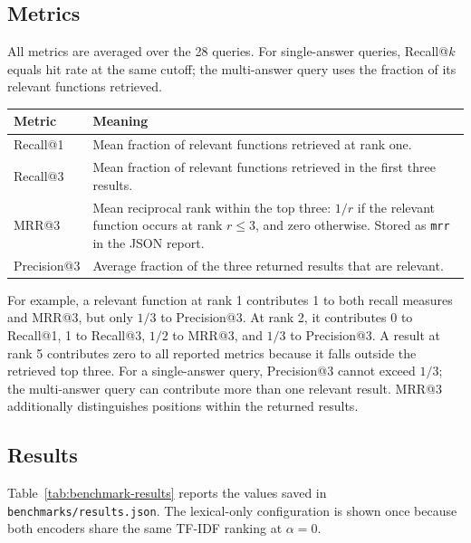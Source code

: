 \documentclass[12pt]{article}
\begin{document}
\subsection{Metrics}
\label{subsec:benchmark-meaning}

All metrics are averaged over the 28 queries. For single-answer queries, Recall@\(k\) equals hit rate at the same cutoff;
the multi-answer query uses the fraction of its relevant functions retrieved.

\begin{center}
  \small
  \setlength{\tabcolsep}{5pt}
  \begin{tabularx}{\linewidth}{>{\raggedright\arraybackslash}p{0.95in} >{\raggedright\arraybackslash}X}
    \toprule
    Metric & Meaning \\
    \midrule
    Recall@1 & Mean fraction of relevant functions retrieved at rank one. \\
    Recall@3 & Mean fraction of relevant functions retrieved in the first three results. \\
    MRR@3 & Mean reciprocal rank within the top three: \(1/r\) if the relevant function occurs at rank \(r\leq3\), and zero otherwise. Stored as \texttt{mrr} in the JSON report. \\
    Precision@3 & Average fraction of the three returned results that are relevant. \\
    \bottomrule
  \end{tabularx}
  \normalsize
\end{center}

For example, a relevant function at rank 1 contributes 1 to both recall measures and MRR@3, but only \(1/3\) to Precision@3.
At rank 2, it contributes 0 to Recall@1, 1 to Recall@3, \(1/2\) to MRR@3, and \(1/3\) to Precision@3.
A result at rank 5 contributes zero to all reported metrics because it falls outside the retrieved top three.
For a single-answer query, Precision@3 cannot exceed \(1/3\); the multi-answer query can contribute more than one relevant
result. MRR@3 additionally distinguishes positions
within the returned results.

\subsection{Results}
\label{subsec:benchmark-results}

Table~\ref{tab:benchmark-results} reports the values saved in \texttt{benchmarks/results.json}.
The lexical-only configuration is shown once because both encoders share the same TF-IDF ranking at \(\alpha=0\).
\end{document}
